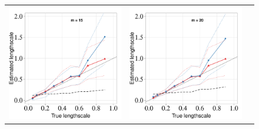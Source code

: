 \documentclass[]{interact}
\theoremstyle{plain}%
\theoremstyle{definition}
\theoremstyle{remark}
\begin{document}
\begin{figure}
\begin{flushleft}
\begin{tabular}{ccc}
\includegraphics[scale=0.30, trim = 25mm 24mm 7mm 10mm, clip]{fig8_Tlscale_vs_Elscale_part2.pdf} & \hspace{-4mm} \includegraphics[scale=0.30, trim = 25mm 24mm 7mm 10mm, clip]{fig8_Tlscale_vs_Elscale_part3.pdf} \\ 

\end{tabular}
\end{flushleft}
\end{figure}
\end{document}
